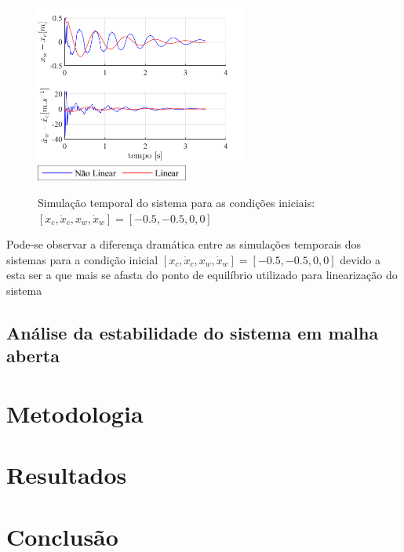\documentclass[a4paper]{ifacconf}
\begin{document}
    \FloatBarrier
    \begin{figure}[htbp]
        \begin{centering}
            \includegraphics[width=7cm]{img/sim_temp_xc_n05_dxc_n05.png}
            \includegraphics[width=5cm]{img/sim_temp_Leg.png}
            \caption{Simulação temporal do sistema para as condições iniciais:  $[x_c, \dot{x}_c, x_w, \dot{x}_w]=[-0.5,-0.5,0,0]$}
            \label{fig:sim_temp_xc_n01_dxc_n01}
        \end{centering}
    \end{figure}
    \FloatBarrier
    
    Pode-se observar a diferença dramática entre as simulações temporais dos sistemas para a condição inicial $[x_c, \dot{x}_c, x_w, \dot{x}_w]=[-0.5,-0.5,0,0]$ devido a esta ser a que mais se afasta do ponto de equilíbrio utilizado para linearização do sistema
    
    \subsection{Análise da estabilidade do sistema em malha aberta}
    
    \section{Metodologia}
    \section{Resultados}
    \section{Conclusão}
    
    
    
    \appendix
\end{document}
